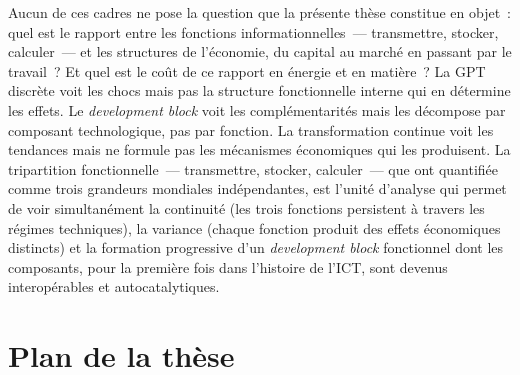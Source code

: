 Aucun de ces cadres ne pose la question que la présente thèse constitue en objet~: quel est le rapport entre les fonctions informationnelles~--- transmettre, stocker, calculer~--- et les structures de l'économie, du capital au marché en passant par le travail~? Et quel est le coût de ce rapport en énergie et en matière~? La GPT discrète voit les chocs mais pas la structure fonctionnelle interne qui en détermine les effets. Le \emph{development block} voit les complémentarités mais les décompose par composant technologique, pas par fonction. La transformation continue voit les tendances mais ne formule pas les mécanismes économiques qui les produisent. La tripartition fonctionnelle~--- transmettre, stocker, calculer~--- que \textcite{hilbert_worlds_2011} ont quantifiée comme trois grandeurs mondiales indépendantes, est l'unité d'analyse qui permet de voir simultanément la continuité (les trois fonctions persistent à travers les régimes techniques), la variance (chaque fonction produit des effets économiques distincts) et la formation progressive d'un \emph{development block} fonctionnel dont les composants, pour la première fois dans l'histoire de l'ICT, sont devenus interopérables et autocatalytiques.


\section*{Plan de la thèse}

